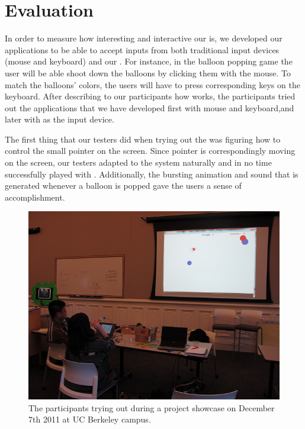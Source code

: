 \section{Evaluation}\label{sec:eval}

In order to measure how interesting and interactive our \tube is, we developed our applications to be able to accept inputs from both traditional input devices (\ie mouse and keyboard) and our \tube. For instance, in the balloon popping game the user will be able shoot down the balloons by clicking them with the mouse. To match the balloons’ colors, the users will have to press corresponding keys on the keyboard.
After describing to our participants how \tube works, the participants tried out the applications that we have developed first with mouse and keyboard,and later with \tube as the input device.


The first thing that our testers did when trying out the \tube was figuring how to control the small pointer on the screen. Since pointer is correspondingly moving on the screen, our testers adapted to the system naturally and in no time successfully played with \tube. Additionally, the bursting animation and sound that is generated whenever a balloon is popped gave the users a sense of accomplishment.

\begin{figure}
  \centering
  \includegraphics[width=\linewidth]{./figs/impl2.png}
  \caption{The participants trying out \tube during a project showcase on December 7th 2011 at UC Berkeley campus.}
  \label{fig:impl2}
\end{figure}

